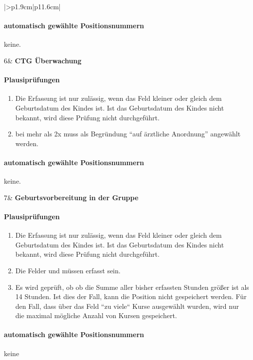 \begin{mpsupertabular}{|>{\centering}p{1.9cm}|p{11.6cm}|}
\paragraph{automatisch gewählte Positionsnummern}
keine.
\\ \hline


6&
\textbf{CTG Überwachung}
\paragraph{Plausiprüfungen}
\begin{enumerate}
\item
Die Erfassung ist nur zulässig, wenn das Feld  kleiner 
oder gleich dem Geburtsdatum des Kindes ist. Ist das Geburtsdatum des
Kindes nicht bekannt, wird diese Prüfung nicht durchgeführt.
\item
bei mehr als 2x muss als Begründung ``auf ärztliche Anordnung'' 
angewählt werden.
\end{enumerate}
\paragraph{automatisch gewählte Positionsnummern}
keine.
\\ \hline


7&
\textbf{Geburtsvorbereitung in der Gruppe}
\paragraph{Plausiprüfungen}
\begin{enumerate}
\item
Die Erfassung ist nur zulässig, wenn das Feld  kleiner 
oder gleich dem Geburtsdatum des Kindes ist. Ist das Geburtsdatum des
Kindes nicht bekannt, wird diese Prüfung nicht durchgeführt.
\item
Die Felder  und  müssen erfasst sein.
\item
Es wird geprüft, ob ob die Summe aller bisher erfassten Stunden größer
ist als 14 Stunden. Ist dies der Fall, kann die Position nicht gespeichert
werden. Für den Fall, dass über das Feld  ``zu viele``
Kurse ausgewählt wurden, wird nur die maximal mögliche Anzahl von Kursen
gespeichert.
\end{enumerate}
\paragraph{automatisch gewählte Positionsnummern}
keine
\\ \hline



\end{mpsupertabular}
